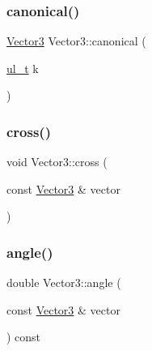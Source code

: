 \mbox{\label{class_vector3_ad4e477e53b06ae7db1b85bb5f59451d1}} 
\subsubsection{\texorpdfstring{canonical()}{canonical()}}
{\footnotesize\ttfamily \mbox{\hyperlink{class_vector3}{Vector3}} Vector3\+::canonical (\begin{DoxyParamCaption}\item[{\mbox{\hyperlink{typedef_8h_a1b140a2034db3f5dfe18a987745df43a}{ul\+\_\+t}}}]{k }\end{DoxyParamCaption})\hspace{0.3cm}{\ttfamily [static]}}

\mbox{\label{class_vector3_a2197fa650334cfd893c96e0e709de1ef}} 
\subsubsection{\texorpdfstring{cross()}{cross()}}
{\footnotesize\ttfamily void Vector3\+::cross (\begin{DoxyParamCaption}\item[{const \mbox{\hyperlink{class_vector3}{Vector3}} \&}]{vector }\end{DoxyParamCaption})\hspace{0.3cm}{\ttfamily [protected]}}

\mbox{\label{class_vector3_a4ec864436ebac499950f4c06091688db}} 
\subsubsection{\texorpdfstring{angle()}{angle()}}
{\footnotesize\ttfamily double Vector3\+::angle (\begin{DoxyParamCaption}\item[{const \mbox{\hyperlink{class_vector3}{Vector3}} \&}]{vector }\end{DoxyParamCaption}) const\hspace{0.3cm}{\ttfamily [protected]}}

\mbox{\label{class_vector3_a98422ceb8200829cea11bdeb6417daba}} 
